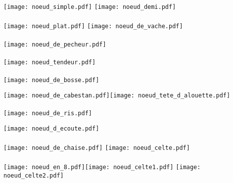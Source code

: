 \documentclass{livret}
\begin{document}
\texttt{[image: noeud\_simple.pdf]} \hfill \texttt{[image: noeud\_demi.pdf]}\\
\\
\texttt{[image: noeud\_plat.pdf]} \hfill \texttt{[image: noeud\_de\_vache.pdf]}\\
\\
\texttt{[image: noeud\_de\_pecheur.pdf]}\\
\\
\texttt{[image: noeud\_tendeur.pdf]}\\
\\
\texttt{[image: noeud\_de\_bosse.pdf]}\\

\newpage

\begin{minipage}[b]{7cm}
 \texttt{[image: noeud\_de\_cabestan.pdf]}\texttt{[image: noeud\_tete\_d\_alouette.pdf]}\\\\
 \texttt{[image: noeud\_de\_ris.pdf]}
\end{minipage} \hfill \texttt{[image: noeud\_d\_ecoute.pdf]}\\
\\
\texttt{[image: noeud\_de\_chaise.pdf]} \hfill \texttt{[image: noeud\_celte.pdf]}\\
\\
\texttt{[image: noeud\_en\_8.pdf]}\texttt{[image: noeud\_celte1.pdf]} \hfill \texttt{[image: noeud\_celte2.pdf]}
\end{document}
